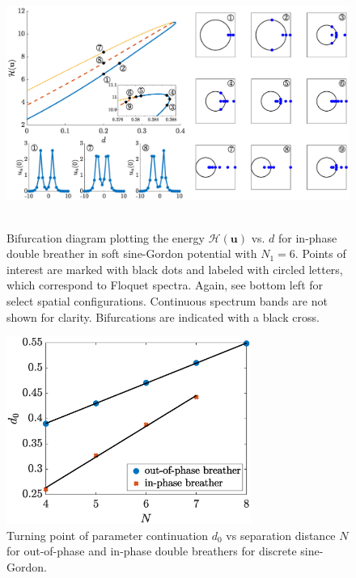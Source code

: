 \documentclass[12pt,reqno]{amsart}
\newcommand{\uvec}{\mathbf{u}}
\theoremstyle{definition}
\begin{document}
\begin{figure}
	\hbox{
	\hspace{-2cm}
	\includegraphics[width=20cm]{bifdiagSGinphaseN6.eps} 
	}
	\caption{Bifurcation diagram plotting the energy $\mathcal{H}(\uvec)$ vs. $d$ for in-phase double breather in soft sine-Gordon potential with $N_1 = 6$. Points of interest are marked with black dots and labeled with circled letters, which correspond to Floquet spectra. 
	Again, see bottom left for select spatial configurations.
	Continuous spectrum bands are not shown for clarity. Bifurcations are indicated with a black cross. }
	\label{fig:bifdiagSGip1}
\end{figure}

\begin{figure}
	\begin{center}
	\includegraphics[width=8cm]{doubled0vsN.eps} 
	\end{center}
	\caption{Turning point of parameter continuation $d_0$ vs separation distance $N$ for out-of-phase and in-phase double breathers for discrete sine-Gordon.}
	\label{fig:SGd0}
\end{figure}
\end{document}
